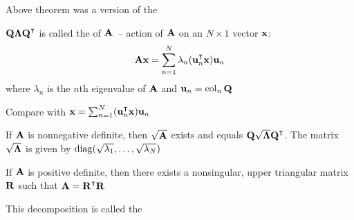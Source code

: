\begin{frame}

   \vspace{2em}

    Above theorem was a version of the 

    $\boldQ \boldLambda \boldQ^\T$ is called the  of $\mathbf A$\ -- action of $\mathbf A$ on an
    $N \times 1$ vector ${\mathbf x}$:
    \begin{equation*}
        \boldA\boldx = \sum_{n=1}^N \lambda_n (\boldu_n^\T \boldx) \boldu_n
    \end{equation*}
    where $\lambda_n$ is the $n$th eigenvalue of $\mathbf A$ and ${\mathbf u}_n = \operatorname{col}_n \mathbf Q$
    
    \vspace{.7em}
    Compare with $\boldx = \sum_{n=1}^N (\boldu_n^\T \boldx) \boldu_n$
    
\end{frame}

\begin{frame}

    \vspace{2em}
    \Fact{\eqref{ET-fa:sqrtsnd}}
    If $\mathbf A$ is nonnegative definite, then $\sqrt{\mathbf A}$
    exists and equals $\boldQ \sqrt{\boldLambda} \boldQ^\T$.
    The matrix $\sqrt{{\boldsymbol \Lambda}}$ is given by $\operatorname{diag}(\sqrt{\lambda_1},
    \ldots, \sqrt{\lambda_N})$
    
    \vspace{.7em}
    \Fact{\eqref{ET-fa:cholesky}}
    If $\mathbf A$ is positive definite, then there exists a nonsingular, upper
    triangular matrix $\mathbf R$ such that $\boldA = \boldR^\T \boldR$
    
    This decomposition is called the 

\end{frame}

